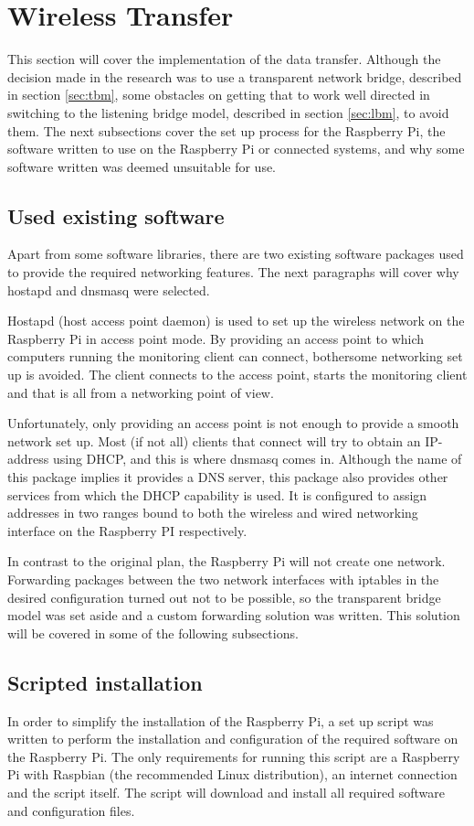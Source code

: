 \section{Wireless Transfer}
This section will cover the implementation of the data transfer. Although the decision made in the research was to use a transparent network bridge, described in section \ref{sec:tbm}, some obstacles on getting that to work well directed in switching to the listening bridge model, described in section \ref{sec:lbm}, to avoid them. The next subsections cover the set up process for the Raspberry Pi, the software written to use on the Raspberry Pi or connected systems, and why some software written was deemed unsuitable for use.
\subsection{Used existing software}
Apart from some software libraries, there are two existing software packages used to provide the required networking features. The next paragraphs will cover why hostapd and dnsmasq were selected.

Hostapd (host access point daemon) is used to set up the wireless network on the Raspberry Pi in access point mode. By providing an access point to which computers running the monitoring client can connect, bothersome networking set up is avoided. The client connects to the access point, starts the monitoring client and that is all from a networking point of view.

Unfortunately, only providing an access point is not enough to provide a smooth network set up. Most (if not all) clients that connect will try to obtain an IP-address using DHCP, and this is where dnsmasq comes in. Although the name of this package implies it provides a DNS server, this package also provides other services from which the DHCP capability is used. It is configured to assign addresses in two ranges bound to both the wireless and wired networking interface on the Raspberry PI respectively.

In contrast to the original plan, the Raspberry Pi will not create one network. Forwarding packages between the two network interfaces with iptables in the desired configuration turned out not to be possible, so the transparent bridge model was set aside and a custom forwarding solution was written. This solution will be covered in some of the following subsections.

\subsection{Scripted installation}
In order to simplify the installation of the Raspberry Pi, a set up script was written to perform the installation and configuration of the required software on the Raspberry Pi. The only requirements for running this script are a Raspberry Pi with Raspbian (the recommended Linux distribution), an internet connection and the script itself. The script will download and install all required software and configuration files.

